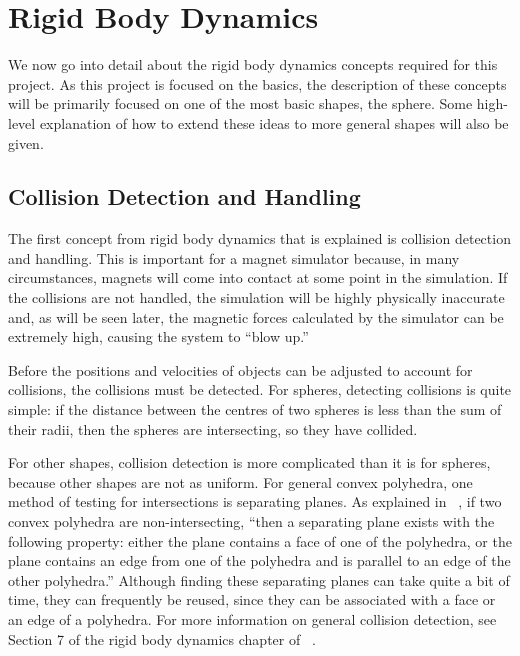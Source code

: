 \documentclass[tog]{acmsiggraph}
\begin{document}
\section{Rigid Body Dynamics}

We now go into detail about the rigid body dynamics concepts required for this project. As this project is focused on the basics, the description of these concepts will be primarily focused on one of the most basic shapes, the sphere. Some high-level explanation of how to extend these ideas to more general shapes will also be given.

\subsection{Collision Detection and Handling}

The first concept from rigid body dynamics that is explained is collision detection and handling. This is important for a magnet simulator because, in many circumstances, magnets will come into contact at some point in the simulation. If the collisions are not handled, the simulation will be highly physically inaccurate and, as will be seen later, the magnetic forces calculated by the simulator can be extremely high, causing the system to ``blow up.''

Before the positions and velocities of objects can be adjusted to account for collisions, the collisions must be detected. For spheres, detecting collisions is quite simple: if the distance between the centres of two spheres is less than the sum of their radii, then the spheres are intersecting, so they have collided.

For other shapes, collision detection is more complicated than it is for spheres, because other shapes are not as uniform. For general convex polyhedra, one method of testing for intersections is separating planes. As explained in ~\cite{pixarnotes}, if two convex polyhedra are non-intersecting, ``then a separating plane exists with the following property: either the plane contains a face of one of the polyhedra, or the plane contains an edge from one of the polyhedra and is parallel to an edge of the other polyhedra.'' Although finding these separating planes can take quite a bit of time, they can frequently be reused, since they can be associated with a face or an edge of a polyhedra. For more information on general collision detection, see Section 7 of the rigid body dynamics chapter of ~\cite{pixarnotes}.
\end{document}

